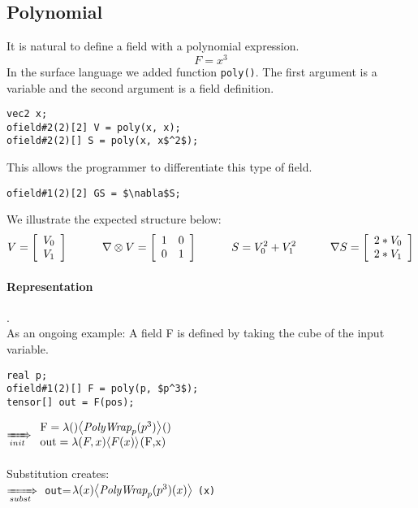 \documentclass{article}
\begin{document}
\subsection{Polynomial}
It is natural to define a field with a polynomial expression. $$F = x^3$$
In the surface language we added function \lstinline[mathescape=true]!poly()!.
The first argument is a variable and the second argument is a field definition.
\begin{lstlisting}[mathescape=true]
vec2 x;
ofield#2(2)[2] V = poly(x, x);
ofield#2(2)[] S = poly(x, x$^2$);
\end{lstlisting}
This allows the programmer to differentiate this type of field.
\begin{lstlisting}[mathescape=true]
ofield#1(2)[2] GS = $\nabla$S;
\end{lstlisting}
We illustrate the expected structure below:
\begin{displaymath}
  V=\left[ \begin{array}{ll}
  V_0 \\  V_1  \\
  \end{array}
 \right]   \indent\indent 
  \nabla \otimes V=\left[ \begin{array}{ll}
 1&   0 \\  0  &  1  \\
  \end{array}
 \right]   \indent\indent 
   S=  V_0 ^2+  V_1^2  \\
  \indent\indent
    \nabla S=\left[ \begin{array}{ll}
  2*V_0 \\  2*V_1  \\
  \end{array}
 \right] 
 \end{displaymath}

\paragraph{Representation}.\\
As an ongoing example:
A field F is defined by taking the cube of the input variable.\begin{lstlisting}[mathescape=true]
real p; 
ofield#1(2)[] F = poly(p, $p^3$);
tensor[] out = F(pos);
\end{lstlisting}

$\rewriteInitA \begin{array}{ll} \lstinline[mathescape=true]!F!=\lambda ()\EinExp{\expPolyWrap{p}{{p}^3}}{}()\\
\lstinline[mathescape=true]!out!=\lambda(F,x) \EinExp{F(x)}{}\lstinline[mathescape=true]!(F,x)!\end{array}$\\
\\
Substitution creates:\\
$\xRightarrow[subst]{}{}$ \lstinline[mathescape=true]!out!=$\lambda(x) {\left\langle{\textit{PolyWrap}_{p}({p^3})(x)}\right\rangle}_{}$
\lstinline[mathescape=true]!(x)!
\end{document}

